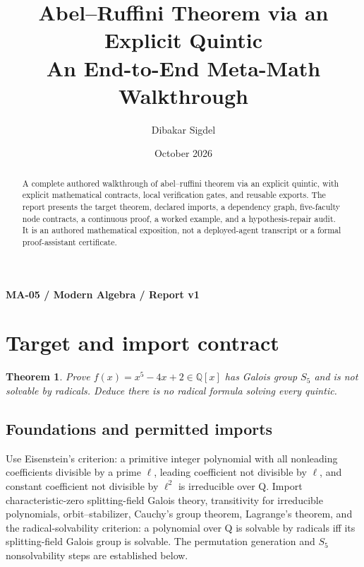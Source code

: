 \documentclass[preprint,12pt,aps,pra,showkeys,amsmath,amssymb,superscriptaddress,floatfix]{revtex4-2}
\newtheorem{theorem}{Theorem}[section]
\theoremstyle{definition}
\theoremstyle{remark}
\begin{document}
\title{Abel--Ruffini Theorem via an Explicit Quintic\\[4pt]\large An End-to-End Meta-Math Walkthrough}

\author{Dibakar Sigdel}


\date{October 2026}

\begin{abstract}

A complete authored walkthrough of abel--ruffini theorem via an explicit
quintic, with explicit mathematical contracts, local verification gates,
and reusable exports. The report presents the target theorem, declared
imports, a dependency graph, five-faculty node contracts, a continuous
proof, a worked example, and a hypothesis-repair audit. It is an
authored mathematical exposition, not a deployed-agent transcript or a
formal proof-assistant certificate.

\end{abstract}\maketitle\linespread{1.12}\selectfont

\noindent\textbf{MA-05 / Modern Algebra / Report v1}

\section{Target and import contract}

\begin{theorem}

Prove \(f(x)=x^5-4x+2\in\mathbb Q[x]\) has Galois group \(S_5\) and is
not solvable by radicals. Deduce there is no radical formula solving
every quintic.

\end{theorem}

\subsection{Foundations and permitted imports}

Use Eisenstein's criterion: a primitive integer polynomial with all
nonleading coefficients divisible by a prime \(\ell\), leading
coefficient not divisible by \(\ell\), and constant coefficient not
divisible by \(\ell ^{2}\) is irreducible over Q. Import
characteristic-zero splitting-field Galois theory, transitivity for
irreducible polynomials, orbit--stabilizer, Cauchy's group theorem,
Lagrange's theorem, and the radical-solvability criterion: a polynomial
over Q is solvable by radicals iff its splitting-field Galois group is
solvable. The permutation generation and \(S_{5}\) nonsolvability steps
are established below.
\end{document}
